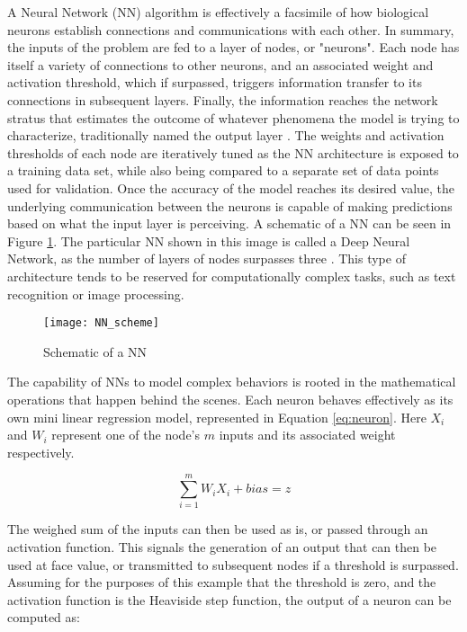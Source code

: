 \documentclass[main.tex]{subfiles}
\begin{document}
A Neural Network (NN) algorithm is effectively a facsimile of how biological neurons establish connections and communications with each other. In summary, the inputs of the problem are fed to a layer of nodes, or "neurons". Each node has itself a variety of connections to other neurons, and an associated weight and activation threshold, which if surpassed, triggers information transfer to its connections in subsequent layers. Finally, the information reaches the network stratus that estimates the outcome of whatever phenomena the model is trying to characterize, traditionally named the output layer \cite {Chollet2018, IBMCloudEducation2020, Geron2019}. The weights and activation thresholds of each node are iteratively tuned as the NN architecture is exposed to a training data set, while also being compared to a separate set of data points used for validation. Once the accuracy of the model reaches its desired value, the underlying communication between the neurons is capable of making predictions based on what the input layer is perceiving. A schematic of a NN can be seen in Figure \ref{fig:NN}. The particular NN shown in this image is called a Deep Neural Network, as the number of layers of nodes surpasses three \cite{IBMCloudEducation2020}. This type of architecture tends to be reserved for computationally complex tasks, such as text recognition or image processing.  

\begin{figure}[!htbp]
	\center
	\texttt{[image: NN\_scheme]}
	\caption{Schematic of a NN \cite{IBMCloudEducation2020}} \label{fig:NN}
\end{figure}

The capability of NNs to model complex behaviors is rooted in the mathematical operations that happen behind the scenes. Each neuron behaves effectively as its own mini linear regression model, represented in Equation \ref{eq:neuron}. Here $X_{i}$ and $W_{i}$ represent one of the node's $m$ inputs and its associated weight respectively.  

\begin{equation} \label{eq:neuron}
	\sum_{i=1}^{m} W_{i}X_{i} + bias = z
\end{equation}  

The weighed sum of the inputs can then be used as is, or passed through an activation function. This signals the generation of an output that can then be used at face value, or transmitted to subsequent nodes if a threshold is surpassed. Assuming for the purposes of this example that the threshold is zero, and the activation function is the Heaviside step function, the output of a neuron can be computed as:
\end{document}
